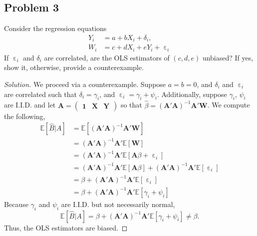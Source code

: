 \documentclass{amsart}
\DeclareMathOperator{\ep}{\varepsilon}
\newcommand{\bvec}[1]{{\boldsymbol #1}}
\begin{document}
		\subsection*{Problem 3} %
		\label{sub:problem_3}
			Consider the regression equations
				\begin{align}
					Y_{i} &= a + bX_{i} + \delta_{i}, \\
					W_{i} &= c + dX_{i} + eY_{i} + \ep_{i}
				\end{align}
				If $\ep_{i}$ and $\delta_{i}$ are correlated, are the OLS estimators of $(c, d, e)$ unbiased? 
				If yes, show it, otherwise, provide a counterexample.
			\begin{proof}[Solution]
				We proceed via a counterexample. 
				Suppose $a = b = 0$, and $\delta_{i}$ and $\ep_{i}$ are correlated such that $\delta_{i} = \gamma_{i}$, and $\ep_{i} = \gamma_{i} + \psi_{i}$.
				Additionally, suppose $\gamma_{i}$, $\psi_{i}$ are I.I.D. and let $\bvec{A} = \begin{pmatrix} \bvec{1} & \bvec{X} & \bvec{Y} \end{pmatrix}$ so that $\hat{\beta} = (\bvec{A}'\bvec{A})^{-1}\bvec{A}'\bvec{W}$.
				We compute the following,
					\begin{align*}
					\mathbb{E}\left[\hat{B}|A\right]&=\mathbb{E}\left[(\bvec{A}'\bvec{A})^{-1}\bvec{A}'\bvec{W}\right] \\
					&= (\bvec{A}'\bvec{A})^{-1}\bvec{A}'\mathbb{E}\left[\bvec{W}\right] \\
					&= (\bvec{A}'\bvec{A})^{-1}\bvec{A}'\mathbb{E}\left[\bvec{A}\beta + \ep_{i}\right] \\
					&= (\bvec{A}'\bvec{A})^{-1}\bvec{A}'\mathbb{E}\left[\bvec{A}\beta\right] + (\bvec{A}'\bvec{A})^{-1}\bvec{A}'\mathbb{E}\left[\ep_{i}\right] \\
					&= \beta + (\bvec{A}'\bvec{A})^{-1}\bvec{A}' \mathbb{E}\left[\ep_{i}\right]  \\
					&= \beta + (\bvec{A}'\bvec{A})^{-1}\bvec{A}' \mathbb{E}\left[\gamma_{i} + \psi_{i}\right]
					\end{align*}
					Because $\gamma_{i}$ and $\psi_{i}$ are I.I.D. but not necessarily normal, $$\mathbb{E}\left[ \hat{B}|A \right] = \beta + (\bvec{A}'\bvec{A})^{-1} \bvec{A}'\mathbb{E}\left[\gamma_{i} + \psi_{i}\right] \neq \beta.$$ Thus, the OLS estimators are biased.
			\end{proof}
\end{document}
